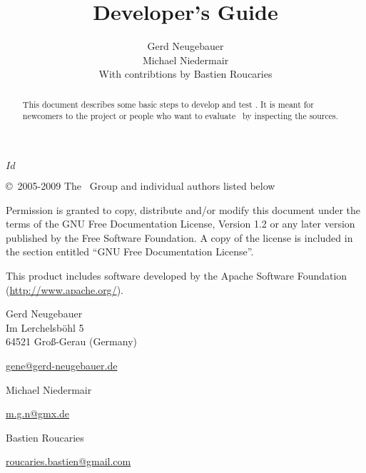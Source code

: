 \documentclass{extex-doc}
\begin{document}
\SVN$Id$

\begin{titlepage}\parindent=0pt

  \title{Developer's Guide}
  \author{Gerd Neugebauer\\[1ex]%
    Michael Niedermair\\[1ex]%
    With contribtions by Bastien Roucaries}
  \maketitle

  \begin{center}
    \begin{abstract}\noindent
      This document describes some basic steps to develop and test
      \ExTeX.  It is meant for newcomers to the project or people who
      want to evaluate \ExTeX\ by inspecting the sources.
    \end{abstract}
  \end{center}
  \newpage
  \footnotesize
  \copyright\ 2005-2009 The \ExTeX\ Group and individual authors listed below
  \medskip

Permission is granted to copy, distribute and/or modify this document
under the terms of the GNU Free Documentation License, Version 1.2 or
any later version published by the Free Software Foundation. A copy of
the license is included in the section entitled ``GNU Free
Documentation License''.
\bigskip

This product includes software developed by the Apache Software
Foundation (\url{http://www.apache.org/}).

\vfill

Gerd Neugebauer\\
Im Lerchelsb\"ohl 5\\
64521 Gro\ss-Gerau (Germany)
\smallskip\par
\href{mailto://gene@gerd-neugebauer.de}{gene@gerd-neugebauer.de}
\bigskip

Michael Niedermair
\smallskip\par
\href{mailto://m.g.n@gmx.de}{m.g.n@gmx.de}
\bigskip

Bastien Roucaries
\smallskip\par
\href{mailto://roucaries.bastien@gmail.com}{roucaries.bastien@gmail.com}

\end{titlepage}

\tableofcontents
\newpage
\end{document}
